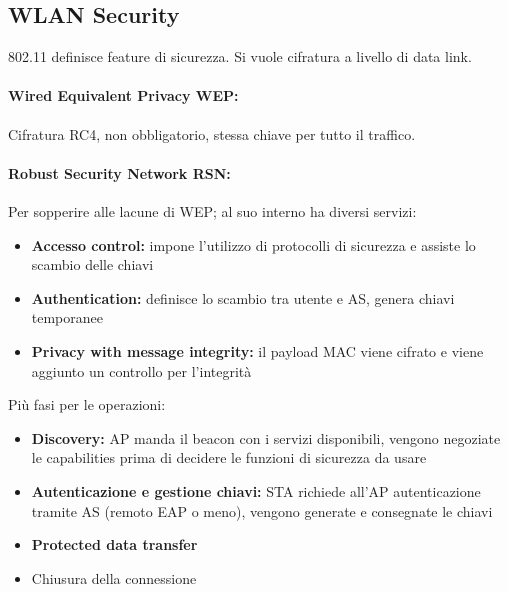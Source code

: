 \subsection{WLAN Security}

802.11 definisce feature di sicurezza. Si vuole cifratura a livello di data link.

\paragraph{Wired Equivalent Privacy WEP:} Cifratura RC4, non obbligatorio, stessa chiave per tutto il traffico.

\paragraph{Robust Security Network RSN:} Per sopperire alle lacune di WEP; al suo interno ha diversi servizi: 
\begin{itemize}
    \item \textbf{Accesso control:} impone l’utilizzo di protocolli di sicurezza e assiste lo scambio delle chiavi
    
    \item \textbf{Authentication:} definisce lo scambio tra utente e AS, genera chiavi temporanee 
    
    \item \textbf{Privacy with message integrity:} il payload MAC viene cifrato e viene aggiunto un controllo per l'integrità
\end{itemize}

Più fasi per le operazioni:
\begin{itemize}
    \item \textbf{Discovery:} AP manda il beacon con i servizi disponibili, vengono negoziate le capabilities prima di decidere le funzioni di sicurezza da usare
    
    \item \textbf{Autenticazione e gestione chiavi:} STA richiede all'AP autenticazione tramite AS (remoto EAP o meno), vengono generate e consegnate le chiavi
    
    \item \textbf{Protected data transfer}
    
    \item Chiusura della connessione
\end{itemize}

